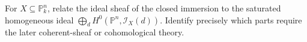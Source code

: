 \begin{problem}\label{chal:vi38-05}
For \(X\subseteq\mathbb P^n_k\), relate the ideal sheaf of the closed immersion to the saturated homogeneous ideal \(\bigoplus_d H^0(\mathbb P^n,\mathcal I_X(d))\).  Identify precisely which parts require the later coherent-sheaf or cohomological theory.
\end{problem}

